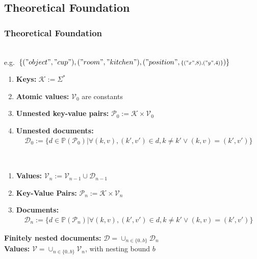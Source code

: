 \subsection{Theoretical Foundation}
\begin{frame}
  \frametitle{Theoretical Foundation}
\begin{description}[]
  \item[Definition of documents representing knowledge] \hfill \\
  \small e.g.~$\{("object","cup"),("room","kitchen"),("position",{\scriptstyle\{("x",8),("y",4)\}})\}$
  \begin{enumerate}
\item \textbf{Keys:} $\mathcal{K} := \Sigma^*$
\item  \textbf{Atomic values:} $\mathcal{V}_0$ are constants
\item \textbf{Unnested key-value pairs:} $\mathcal{P}_0:=\mathcal{K}\times\mathcal{V}_0$
\item \textbf{Unnested documents:} \vspace{-0.3cm}
\begin{align*}
\mathcal{D}_0:=\{
  d\in\mathbb{P}(\mathcal{P}_0)|
  \forall (k,v),(k',v')\in d , k\neq k' \vee (k,v)=(k',v')
  \}
\end{align*}
\end{enumerate}
  \item[With nesting] \hfill \\
  \begin{enumerate}
\item  \textbf{Values:} $\mathcal{V}_n := \mathcal{V}_{n-1} \cup \mathcal{D}_{n-1}$
\item \textbf{Key-Value Pairs:} $\mathcal{P}_n:=\mathcal{K}\times\mathcal{V}_n$
\item \textbf{Documents:} \vspace{-0.3cm}
\begin{align*}
  \mathcal{D}_n:=\{
  d\in\mathbb{P}(\mathcal{P}_n)|
  \forall (k,v),(k',v')\in d , k\neq k' \vee (k,v)=(k',v')
  \}
\end{align*}
\end{enumerate}
  \end{description}
  \textbf{Finitely nested documents:} $\mathcal{D}=\cup_{n\in\{0..b\}}\mathcal{D}_n$\\
  \textbf{Values:} $\mathcal{V}=\cup_{n\in\{0..b\}}\mathcal{V}_n$, with nesting bound $b$
\end{frame}

